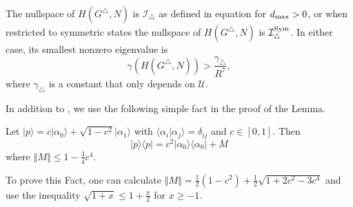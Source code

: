 \documentclass[../thesis-main/thesis-main]{subfiles}
\begin{document}

\begin{lemma}
\label{lem:The-nullspace-of_H_triangle}The nullspace of $H(G^{\triangle},N)$ is $\mathcal{I}_{\triangle}$ as defined in equation  for $d_{\text{max}} >0$, or when restricted to symmetric states the nullspace of $H(G^\triangle,N)$ is $\mathcal{I}_\triangle^{\operatorname{Sym}}$. In either case, its smallest nonzero eigenvalue is 
\begin{equation}
\gamma(H(G^{\triangle},N)) > \frac{\gamma_{\triangle}}{R^{7}},\label{eq:lowerbound_HG_triangle}
\end{equation}
where $\gamma_{\triangle}$ is a constant that only depends on $\mathcal{U}$.
\end{lemma}

In addition to , we use the following simple fact in the proof of the Lemma.

\begin{fact}
\label{fct:lin_alg_fact}
Let $|p\rangle=c|\alpha_{0}\rangle+\sqrt{1-c^{2}}|\alpha_{1}\rangle$ with $\langle\alpha_{i}|\alpha_{j}\rangle=\delta_{ij}$ and $c\in[0,1]$. Then
\begin{equation}
|p\rangle\langle p|=c^{2}|\alpha_{0}\rangle\langle\alpha_{0}|+M
\end{equation}
where $\left\Vert M\right\Vert \leq1-\frac{3}{4}c^{4}$.
\end{fact}

To prove this Fact, one can calculate $\left\Vert M\right\Vert =\frac{1}{2}(1-c^{2})+\frac{1}{2}\sqrt{1+2c^{2}-3c^{4}}$ and use the inequality $\sqrt{1+x}\leq1+\frac{x}{2}$ for $x\geq-1$.
\end{document}
